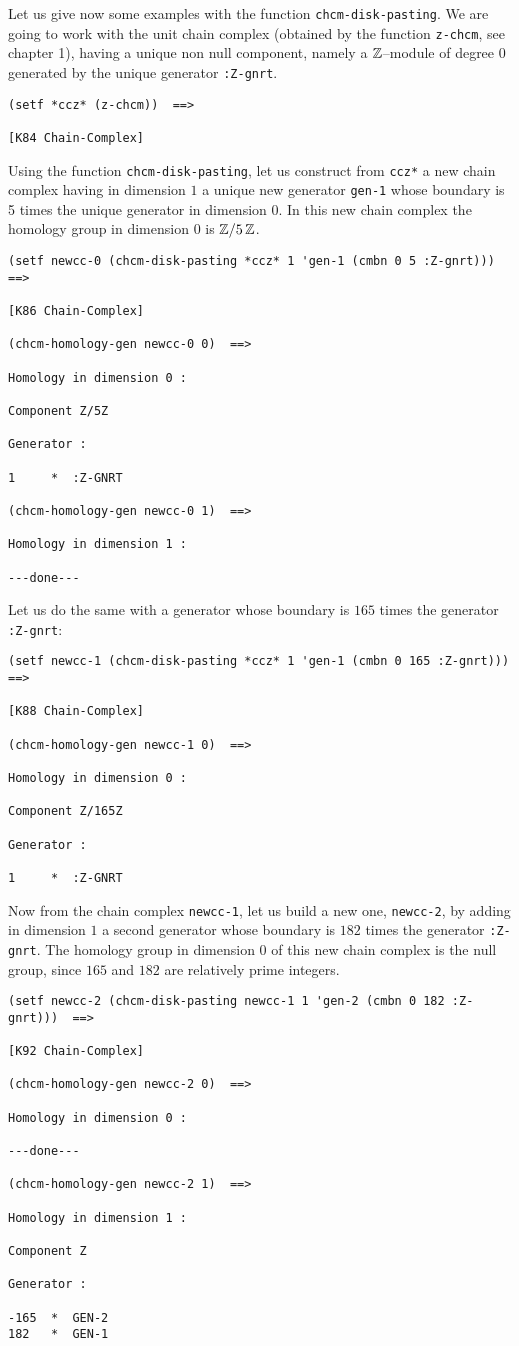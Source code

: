 Let us give now some examples with the function {\tt chcm-disk-pasting}. We are going to work with
the unit chain complex (obtained by the function {\tt z-chcm}, see chapter 1),
having a unique non null component,
namely a ${\mathbb{Z}}$--module of degree $0$ generated by the unique generator {\tt :Z-gnrt}.
{\footnotesize\begin{verbatim}
(setf *ccz* (z-chcm))  ==>

[K84 Chain-Complex]
\end{verbatim}}
Using the function {\tt chcm-disk-pasting}, let us construct from {\tt *ccz*}
a new chain complex  having in dimension $1$ a unique  new generator {\tt gen-1}
whose boundary  is 5 times the unique generator in dimension $0$. In this new chain complex the
homology group in dimension $0$ is  ${\mathbb{Z}}/5\,{\mathbb{Z}}$.
{\footnotesize\begin{verbatim}
(setf newcc-0 (chcm-disk-pasting *ccz* 1 'gen-1 (cmbn 0 5 :Z-gnrt)))  ==>

[K86 Chain-Complex]

(chcm-homology-gen newcc-0 0)  ==>

Homology in dimension 0 :

Component Z/5Z

Generator :

1     *  :Z-GNRT

(chcm-homology-gen newcc-0 1)  ==>

Homology in dimension 1 :

---done---
\end{verbatim}}
Let us do the same with a generator whose boundary is  $165$ times the ge\-ne\-ra\-tor {\tt :Z-gnrt}:
{\footnotesize\begin{verbatim}
(setf newcc-1 (chcm-disk-pasting *ccz* 1 'gen-1 (cmbn 0 165 :Z-gnrt))) ==>

[K88 Chain-Complex]

(chcm-homology-gen newcc-1 0)  ==>

Homology in dimension 0 :

Component Z/165Z

Generator :

1     *  :Z-GNRT
\end{verbatim}}
Now from the chain complex {\tt newcc-1}, let us build a new one, {\tt newcc-2},
by adding in dimension $1$ a second generator whose boundary  is $182$ times
the generator {\tt :Z-gnrt}. The homology group in dimension $0$ of this new chain complex
is  the null group, since $165$ and $182$ are relatively prime integers.
{\footnotesize\begin{verbatim}
(setf newcc-2 (chcm-disk-pasting newcc-1 1 'gen-2 (cmbn 0 182 :Z-gnrt)))  ==>

[K92 Chain-Complex]

(chcm-homology-gen newcc-2 0)  ==>

Homology in dimension 0 :

---done---

(chcm-homology-gen newcc-2 1)  ==>

Homology in dimension 1 :

Component Z

Generator :

-165  *  GEN-2
182   *  GEN-1
\end{verbatim}}

